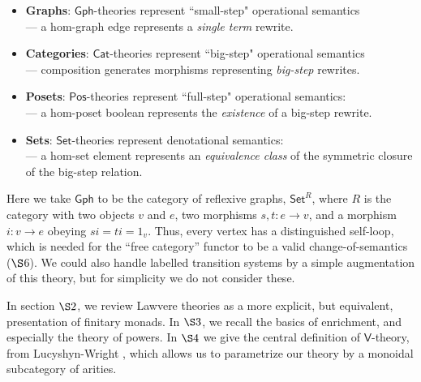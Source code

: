 \documentclass{amsart}
\theoremstyle{definition}
\newcommand{\Gph}{\mathsf{Gph}}
\newcommand{\Set}{\mathsf{Set}}
\newcommand{\Cat}{\mathsf{Cat}}
\newcommand{\Pos}{\mathsf{Pos}}
\newcommand{\V}{\mathsf{V}}
\newcommand{\maps}{\colon}
\begin{document}
\begin{itemize}
\item 
\textbf{Graphs}: $\Gph$-theories represent ``small-step" operational semantics \\ --- a hom-graph edge represents a \textit{single term} rewrite.
\item
\textbf{Categories}: $\Cat$-theories represent ``big-step" operational semantics\\ --- composition 
generates morphisms representing \textit{big-step} rewrites.
\item
\textbf{Posets}: $\Pos$-theories represent ``full-step" operational semantics:\\ --- a hom-poset boolean represents the \textit{existence} of a big-step rewrite.
\item
\textbf{Sets}: $\Set$-theories represent denotational semantics: \\ --- a hom-set element represents an \textit{equivalence class} of the symmetric closure of the big-step relation.
\end{itemize}
Here we take $\Gph$ to be the category of reflexive graphs, $\Set^R$, where $R$ is the category with two objects $v$ and $e$, two morphisms $s,t \maps e \to v$, and a morphism $i \maps v \to e$ obeying $si = ti = 1_v$.  Thus, every vertex has a distinguished self-loop, which is needed for the ``free category'' functor to be a valid change-of-semantics ($\S$6).   We could also handle labelled transition systems by a simple augmentation of this theory, but for simplicity we do not consider these.


In section $\S2$, we review Lawvere theories as a more explicit, but equivalent, presentation of finitary monads. In $\S3$, we recall the basics of enrichment, and especially the theory of powers.  In $\S4$ we give the central definition of $\V$-theory, from Lucyshyn-Wright \cite{rbb}, which allows us to parametrize our theory by a monoidal subcategory of arities.
\end{document}
